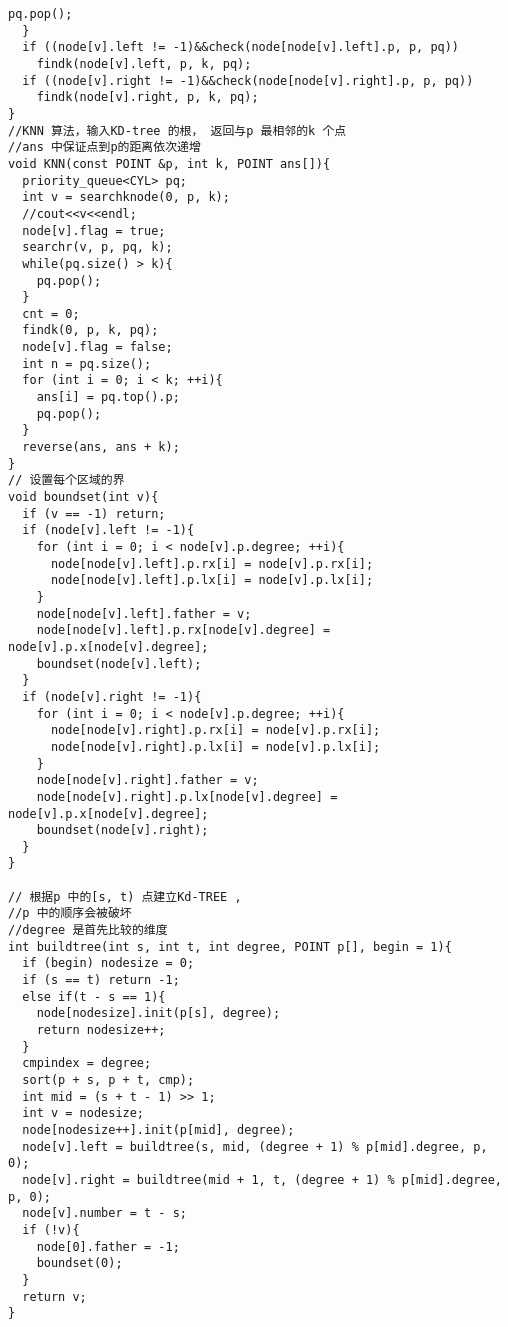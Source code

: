\begin{lstlisting}[language={}]
    pq.pop();
  }
  if ((node[v].left != -1)&&check(node[node[v].left].p, p, pq))
    findk(node[v].left, p, k, pq);
  if ((node[v].right != -1)&&check(node[node[v].right].p, p, pq))
    findk(node[v].right, p, k, pq);
}
//KNN 算法，输入KD-tree 的根， 返回与p 最相邻的k 个点
//ans 中保证点到p的距离依次递增
void KNN(const POINT &p, int k, POINT ans[]){
  priority_queue<CYL> pq;
  int v = searchknode(0, p, k);
  //cout<<v<<endl;
  node[v].flag = true;
  searchr(v, p, pq, k);
  while(pq.size() > k){
    pq.pop();
  }
  cnt = 0;
  findk(0, p, k, pq);
  node[v].flag = false;
  int n = pq.size();
  for (int i = 0; i < k; ++i){
    ans[i] = pq.top().p;
    pq.pop();
  }
  reverse(ans, ans + k);
}
// 设置每个区域的界
void boundset(int v){
  if (v == -1) return;
  if (node[v].left != -1){
    for (int i = 0; i < node[v].p.degree; ++i){
      node[node[v].left].p.rx[i] = node[v].p.rx[i];
      node[node[v].left].p.lx[i] = node[v].p.lx[i];
    }
    node[node[v].left].father = v;
    node[node[v].left].p.rx[node[v].degree] = node[v].p.x[node[v].degree];
    boundset(node[v].left);
  }
  if (node[v].right != -1){
    for (int i = 0; i < node[v].p.degree; ++i){
      node[node[v].right].p.rx[i] = node[v].p.rx[i];
      node[node[v].right].p.lx[i] = node[v].p.lx[i];
    }
    node[node[v].right].father = v;
    node[node[v].right].p.lx[node[v].degree] = node[v].p.x[node[v].degree];
    boundset(node[v].right);
  }
}

// 根据p 中的[s, t) 点建立Kd-TREE ,
//p 中的顺序会被破坏
//degree 是首先比较的维度 
int buildtree(int s, int t, int degree, POINT p[], begin = 1){
  if (begin) nodesize = 0;
  if (s == t) return -1;
  else if(t - s == 1){
    node[nodesize].init(p[s], degree);
    return nodesize++;
  }
  cmpindex = degree;
  sort(p + s, p + t, cmp);
  int mid = (s + t - 1) >> 1;
  int v = nodesize;
  node[nodesize++].init(p[mid], degree);
  node[v].left = buildtree(s, mid, (degree + 1) % p[mid].degree, p, 0);
  node[v].right = buildtree(mid + 1, t, (degree + 1) % p[mid].degree, p, 0);
  node[v].number = t - s;
  if (!v){
    node[0].father = -1;
    boundset(0);
  }
  return v;
}
\end{lstlisting}
